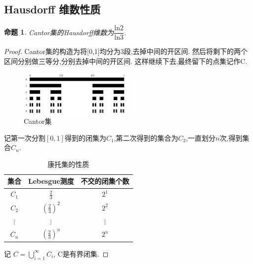 \documentclass[hyperref,a4paper,UTF8]{ctexart}
\newtheorem{proposition}{{命题}}
\begin{document}
\subsection{Hausdorff 维数性质}
\begin{proposition}

  Cantor集的Hausdorff维数为$\dfrac{\mathrm{ln}2}{\mathrm{ln}3}$. 
\end{proposition}

\begin{proof}
Cantor集的构造为将[0,1]均分为3段,去掉中间的开区间. 然后将剩下的两个区间分别做三等分,分别去掉中间的开区间. 这样继续下去,最终留下的点集记作C. 

\begin{figure}[htbp]
  \centering
  \includegraphics[width=0.5\textwidth]{image/cantor.jpg}
  \caption{Cantor集}
\end{figure}

记第一次分割$[0,1]$得到的闭集为$C_1$,第二次得到的集合为$C_2$,一直划分$n$次,得到集合$C_n$. 

\begin{table}[htbp]
  \centering
  \caption{康托集的性质}
  \begin{tabular}{ccc}
  \toprule
  集合 & Lebesgue测度 & 不交的闭集个数 \\
  \midrule
  $C_1$ & $\frac{2}{3}$ & $2^1$ \\
  $C_2$ & $\left(\frac{2}{3}\right)^2$ & $2^2$ \\
  $\vdots$ & $\vdots$ & $\vdots$ \\
  $C_n$ & $\left(\frac{2}{3}\right)^n$ & $2^n$ \\
  \bottomrule
  \end{tabular}
\end{table}

记 $C = \bigcup\limits_{i=1}^{\infty} C_i$, C是有界闭集. 


\end{proof}
\end{document}
